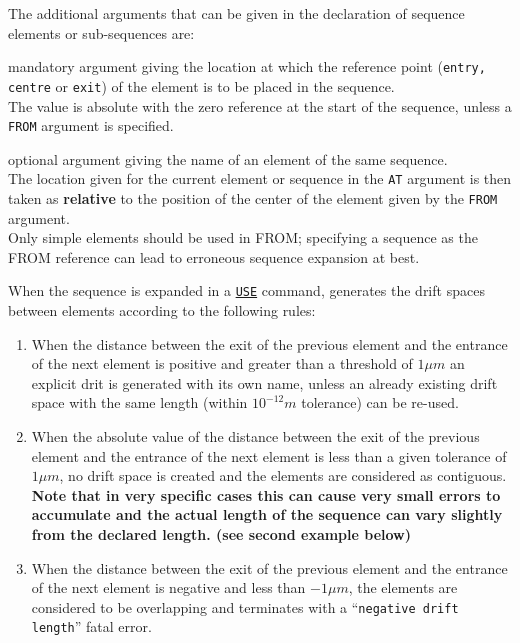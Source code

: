 The additional arguments that can be given in the declaration of sequence 
elements or sub-sequences are: 
\begin{madlist}
   mandatory argument giving the location at
  which the reference point ({\tt entry, centre} or {\tt exit}) of
  the element is to be placed in the sequence. \\
  The value is absolute with the zero reference at the start of the
  sequence, unless a {\tt FROM} argument is specified.

   optional argument giving the name of an
  element of the same sequence. \\
  The location given for the current element or sequence in the {\tt AT}
  argument is then taken as {\bf relative}  to the position of the
  center of the element given by the {\tt FROM} argument. \\
  Only simple elements should be used in FROM; specifying a sequence 
  as the FROM reference can lead to erroneous sequence expansion at best.  
\end{madlist}


When the sequence is expanded in a \hyperref[sec:use]{\tt USE} 
command, \madx generates the drift spaces between elements according to
the following rules: 
\begin{enumerate}
\item When the distance between the exit of the previous element and the
  entrance of the next element is positive and greater than a threshold
  of $1 \mu m$ an explicit drit is generated with its own name, unless
  an already existing drift space with the same length (within $10^{-12}
  m$ tolerance) can be re-used.
\item When the absolute value of the distance between the exit of the 
  previous element and the entrance of the next element is less than a
  given tolerance of $1\mu m$, no drift space is created and the
  elements are considered as contiguous. \\
  {\bf Note that in very specific cases this can cause very small errors
    to accumulate and the actual length of the sequence can vary
    slightly from the declared length. (see second example below)} 
\item When the distance between the exit of the previous element and the 
  entrance of the next element is negative and less than $-1\mu m$,
  the elements are considered to be overlapping and \madx terminates
  with a ``{\tt negative drift length}'' fatal error. 
\end{enumerate} 



